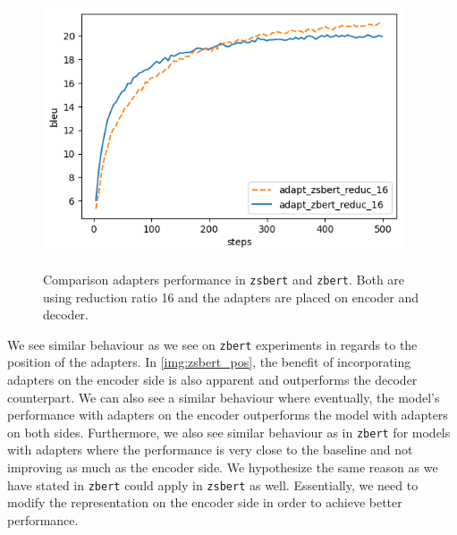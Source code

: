 \begin{figure}[h]
    {\includegraphics[width=0.95\textwidth]{img/zbert_vs_zsbert.png}}
    \centering
    \caption{Comparison adapters performance in \texttt{zsbert} and \texttt{zbert}. Both are using reduction ratio 16 and the adapters are placed on encoder and decoder.}
    \label{img:zbert_vs_zsbert}
\end{figure}

We see similar behaviour as we see on \texttt{zbert} experiments in regards to the position of the adapters. In \cref{img:zsbert_pos}, the benefit of incorporating adapters on the encoder side is also apparent and outperforms the decoder counterpart. We can also see a similar behaviour where eventually, the model's performance with adapters on the encoder outperforms the model with adapters on both sides. Furthermore, we also see similar behaviour as in \texttt{zbert} for models with adapters where the performance is very close to the baseline and not improving as much as the encoder side. We hypothesize the same reason as we have stated in \texttt{zbert} could apply in \texttt{zsbert} as well. Essentially, we need to modify the representation on the encoder side in order to achieve better performance.
